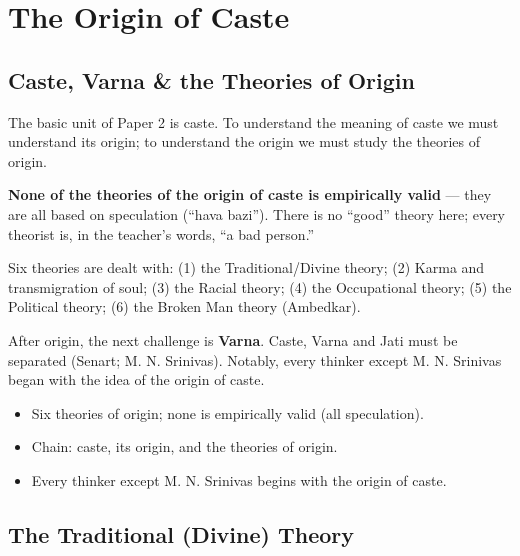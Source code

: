 \chapter{The Origin of Caste}

\section{Caste, Varna \& the Theories of Origin}

The basic unit of Paper 2 is caste. To understand the meaning of caste we must understand its origin; to understand the origin we must study the theories of origin.

\begin{CriticalPoint}
\textbf{None of the theories of the origin of caste is empirically valid} --- they are all based on speculation (``hava bazi''). There is no ``good'' theory here; every theorist is, in the teacher's words, ``a bad person.''
\end{CriticalPoint}

Six theories are dealt with: (1) the Traditional/Divine theory; (2) Karma and transmigration of soul; (3) the Racial theory; (4) the Occupational theory; (5) the Political theory; (6) the Broken Man theory (Ambedkar).

After origin, the next challenge is \textbf{Varna}. Caste, Varna and Jati must be separated (Senart; M. N. Srinivas). Notably, every thinker except M. N. Srinivas began with the idea of the origin of caste.

\begin{QuickRevision}
\begin{itemize}
\item Six theories of origin; none is empirically valid (all speculation).
\item Chain: caste, its origin, and the theories of origin.
\item Every thinker except M. N. Srinivas begins with the origin of caste.
\end{itemize}
\end{QuickRevision}

\section{The Traditional (Divine) Theory}

